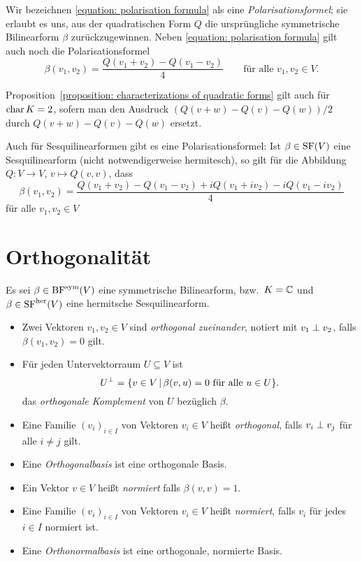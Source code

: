 Wir bezeichnen \eqref{equation: polarisation formula} als eine \emph{Polarisationsformel};
sie erlaubt es uns, aus der quadratischen Form $Q$ die ursprüngliche symmetrische Bilinearform $\beta$ zurückzugewinnen.
Neben \eqref{equation: polarisation formula} gilt auch noch die Polarisationsformel
\[
    \beta(v_1, v_2)
  = \frac{Q(v_1 + v _2) - Q(v_1 - v_2)}{4}
  \qquad
  \text{für alle $v_1, v_2 \in V$}.
\]


\begin{remark}
  Proposition~\ref{proposition: characterizations of quadratic forms} gilt auch für $\operatorname{char} K = 2$, sofern man den Ausdruck $(Q(v+w) - Q(v) - Q(w))/2$ durch $Q(v+w) - Q(v) - Q(w)$ ersetzt.
\end{remark}

Auch für Sesquilinearformen gibt es eine Polarisationsformel:
Ist $\beta \in \operatorname{SF}(V)$ eine Sesquilinearform (nicht notwendigerweise hermitesch), so gilt für die Abbildung $Q \colon V \to V$, $v \mapsto Q(v,v)$, dass
\[
    \beta(v_1, v_2)
  = \frac{Q(v_1 + v_2) - Q(v_1 - v_2) + i Q(v_1 + i v_2) - i Q(v_1 - i v_2)}{4}
\]
für alle $v_1, v_2 \in V$






\section{Orthogonalität}

Es sei $\beta \in \operatorname{BF}^{\operatorname{sym}}(V)$ eine symmetrische Bilinearform, bzw.\ $K = \mathbb{C}$ und $\beta \in \operatorname{SF}^{\operatorname{her}}(V)$ eine hermitsche Sesquilinearform.

\begin{definition}
  \leavevmode
  \begin{itemize}
    \item
      Zwei Vektoren $v_1, v_2 \in V$ sind \emph{orthogonal zueinander}, notiert mit $v_1 \mathrel{\perp} v_2$, falls $\beta(v_1, v_2) = 0$ gilt.
    \item
      Für jeden Untervektorraum $U \subseteq V$ ist
      \[
          U^\perp
        = \{
            v \in V
          \,|\,
            \text{$\beta(v,u) = 0$ für alle $u \in U$}
          \}.
      \]
      das \emph{orthogonale Komplement} von $U$ bezüglich $\beta$.
    \item
      Eine Familie $(v_i)_{i \in I}$ von Vektoren $v_i \in V$ heißt \emph{orthogonal}, falls $v_i \mathrel{\perp} v_j$ für alle $i \neq j$ gilt.
    \item
      Eine \emph{Orthogonalbasis} ist eine orthogonale Basis.
    \item
      Ein Vektor $v \in V$ heißt \emph{normiert} falls $\beta(v,v) = 1$.
    \item
      Eine Familie $(v_i)_{i \in I}$ von Vektoren $v_i \in V$ heißt \emph{normiert}, falls $v_i$ für jedes $i \in I$ normiert ist.
    \item
      Eine \emph{Orthonormalbasis} ist eine orthogonale, normierte Basis.
  \end{itemize}
\end{definition}




